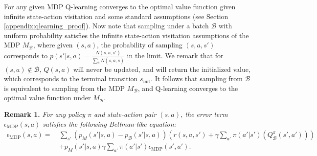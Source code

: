 \documentclass{article}
\newcommand{\e}{\epsilon}
\newcommand{\y}{\gamma}
\newcommand{\lp}{\left (}
\newcommand{\rp}{\right )}
\newcommand{\B}{\mathcal{B}}
\begin{document}
For any given MDP Q-learning converges to the optimal value function given infinite state-action visitation and some standard assumptions (see Section \ref{appendix:qlearning_proof}). Now note that sampling under a batch $\B$ with uniform probability satisfies the infinite state-action visitation assumptions of the MDP $M_\B$, where given $(s,a)$, the probability of sampling $(s,a,s')$ corresponds to $p(s'|s,a) = \frac{N(s,a,s')}{\sum_{\tilde s} N(s,a,\tilde s)}$ in the limit. We remark that for $(s,a) \notin \B$, $Q(s,a)$ will never be updated, and will return the initialized value, which corresponds to the terminal transition $s_\text{init}$. It follows that sampling from $\B$ is equivalent to sampling from the MDP $M_\B$, and Q-learning converges to the optimal value function under $M_\B$. 





\bigskip

\textbf{Remark 1.} \textit{For any policy $\pi$ and state-action pair $(s,a)$, the error term $\e_{\text{MDP}}(s,a)$ satisfies the following Bellman-like equation:}
\begin{equation}
\begin{split}
\e_{\text{MDP}}(s,a) =~&\sum_{s'} \lp p_M(s'|s,a) - p_\B(s'|s,a) \rp \lp r(s,a,s') + \y \sum_{a'} \pi(a'|s') \lp Q^\pi_\B(s',a') \rp \rp \\
&+ p_M(s'|s,a) \y \sum_{a'} \pi(a'|s') \e_{\text{MDP}}(s',a').
\end{split}
\end{equation}
\end{document}
